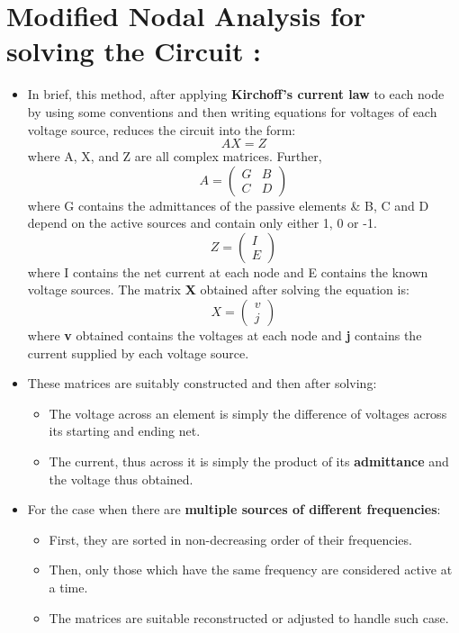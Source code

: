 \documentclass[]{article}
\begin{document}
\section{\LARGE Modified Nodal Analysis for solving the Circuit :}
\Large
\begin{itemize}
	\item In brief, this method, after applying \textbf{Kirchoff's current law} to each node by using some conventions and then writing equations for voltages of each voltage source, reduces the circuit into the form:
	\[AX = Z\]
	where A, X, and Z are all complex matrices. Further,
	\[A = \begin{pmatrix} G & B\\ C & D \end{pmatrix}\]
	where G contains the admittances of the passive elements \& B, C and D depend on the active sources and contain only either 1, 0 or -1.
	\[Z= \begin{pmatrix} I\\ E \end{pmatrix}\]
	where I contains the net current at each node and E contains the known voltage sources. 
	The matrix \textbf{X} obtained after solving the equation is:
	\[X= \begin{pmatrix} v\\ j \end{pmatrix}\]
	where \textbf{v} obtained contains the voltages at each node and \textbf{j} contains the current supplied by each voltage source. 
	\item These matrices are suitably constructed and then after solving:
	\begin{itemize}
		\item The voltage across an element is simply the difference of voltages across its starting and ending net.
		\item The current, thus across it is simply the product of its \textbf{admittance} and the voltage thus obtained.
	\end{itemize}
	\item For the case when there are \textbf{multiple sources of different frequencies}:
	\begin{itemize}
		\item First, they are sorted in non-decreasing order of their frequencies.
		\item Then, only those which have the same frequency are considered active at a time. 
		\item The matrices are suitable reconstructed or adjusted to handle such case. 
	\end{itemize} 
\end{itemize}
\end{document}
